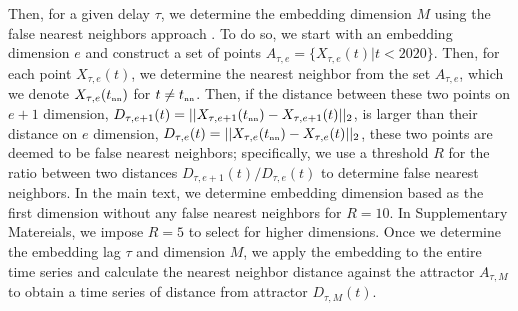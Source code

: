 \documentclass[12pt]{article}
\newcommand{\tsub}[2]{#1_{{\textrm{\tiny #2}}}}
\begin{document}
Then, for a given delay $\tau$, we determine the embedding dimension $M$ using the false nearest neighbors approach \citep{kennel1992determining,tan2023selecting}.
To do so, we start with an embedding dimension $e$ and construct a set of points $A_{\tau,e}= \{X_{\tau,e}(t) | t < 2020\}$.
Then, for each point $X_{\tau,e}(t)$, we determine the nearest neighbor from the set $A_{\tau,e}$, which we denote $X_{\tau,e}(\tsub{t}{nn})$ for $t \neq \tsub{t}{nn}$.
Then, if the distance between these two points on $e+1$ dimension, $D_{\tau,e+1}(t) = ||X_{\tau,e+1}(\tsub{t}{nn})-X_{\tau,e+1}(t)||_2$, is larger than their distance on $e$ dimension, $D_{\tau,e}(t) = ||X_{\tau,e}(\tsub{t}{nn})-X_{\tau,e}(t)||_2$, these two points are deemed to be false nearest neighbors;
specifically, we use a threshold $R$ for the ratio between two distances $D_{\tau,e+1}(t)/D_{\tau,e}(t)$ to determine false nearest neighbors.
In the main text, we determine embedding dimension based as the first dimension without any false nearest neighbors for $R=10$.
In Supplementary Matereials, we impose $R=5$ to select for higher dimensions.
Once we determine the embedding lag $\tau$ and dimension $M$, we apply the embedding to the entire time series and calculate the nearest neighbor distance against the attractor $A_{\tau,M}$ to obtain a time series of distance from attractor $D_{\tau,M}(t)$.
\end{document}
